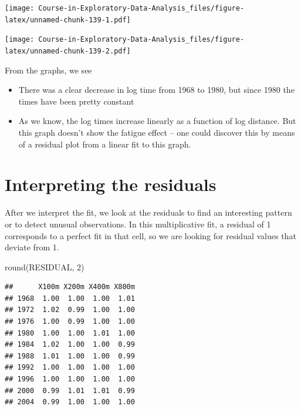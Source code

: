\documentclass[
]{book}
\newenvironment{Shaded}{\begin{snugshade}}{\end{snugshade}}
\newcommand{\AttributeTok}[1]{\textcolor[rgb]{0.77,0.63,0.00}{#1}}
\newcommand{\DecValTok}[1]{\textcolor[rgb]{0.00,0.00,0.81}{#1}}
\newcommand{\FunctionTok}[1]{\textcolor[rgb]{0.00,0.00,0.00}{#1}}
\newcommand{\NormalTok}[1]{#1}
\newcommand{\SpecialCharTok}[1]{\textcolor[rgb]{0.00,0.00,0.00}{#1}}
\providecommand{\tightlist}{%
  \setlength{\itemsep}{0pt}\setlength{\parskip}{0pt}}
\begin{document}
\texttt{[image: Course-in-Exploratory-Data-Analysis\_files/figure-latex/unnamed-chunk-139-1.pdf]}

\begin{Shaded}
\end{Shaded}

\texttt{[image: Course-in-Exploratory-Data-Analysis\_files/figure-latex/unnamed-chunk-139-2.pdf]}

From the graphs, we see

\begin{itemize}
\tightlist
\item
  There was a clear decrease in log time from 1968 to 1980, but since 1980 the times have been pretty constant
\item
  As we know, the log times increase linearly as a function of log distance. But this graph doesn't show the fatigue effect -- one could discover this by means of a residual plot from a linear fit to this graph.
\end{itemize}

\hypertarget{interpreting-the-residuals}{%
\section{Interpreting the residuals}\label{interpreting-the-residuals}}

After we interpret the fit, we look at the residuals to find an interesting pattern or to detect unusual observations. In this multiplicative fit, a residual of 1 corresponds to a perfect fit in that cell, so we are looking for residual values that deviate from 1.

\begin{Shaded}
\begin{Highlighting}[]
\FunctionTok{round}\NormalTok{(RESIDUAL, }\DecValTok{2}\NormalTok{)}
\end{Highlighting}
\end{Shaded}

\begin{verbatim}
##      X100m X200m X400m X800m
## 1968  1.00  1.00  1.00  1.01
## 1972  1.02  0.99  1.00  1.00
## 1976  1.00  0.99  1.00  1.00
## 1980  1.00  1.00  1.01  1.00
## 1984  1.02  1.00  1.00  0.99
## 1988  1.01  1.00  1.00  0.99
## 1992  1.00  1.00  1.00  1.00
## 1996  1.00  1.00  1.00  1.00
## 2000  0.99  1.01  1.01  0.99
## 2004  0.99  1.00  1.00  1.00
\end{verbatim}
\end{document}
